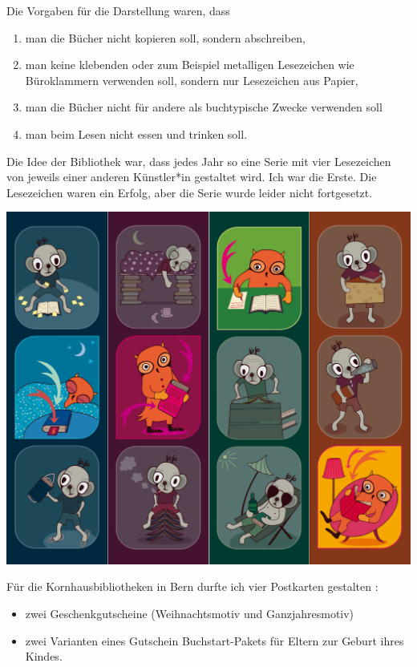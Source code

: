 \documentclass[a4paper,
fontsize=11pt,
oneside,
numbers=noperiodatend,
parskip=half-,
bibliography=totoc,
final
]{scrartcl}
\begin{document}
Die Vorgaben für die Darstellung waren, dass

\begin{enumerate}
\def\labelenumi{\arabic{enumi}.}
\item
  man die Bücher nicht kopieren soll, sondern abschreiben,
\item
  man keine klebenden oder zum Beispiel metalligen Lesezeichen wie
  Büroklammern verwenden soll, sondern nur Lesezeichen aus Papier,
\item
  man die Bücher nicht für andere als buchtypische Zwecke verwenden soll
\item
  man beim Lesen nicht essen und trinken soll.
\end{enumerate}

Die Idee der Bibliothek war, dass jedes Jahr so eine Serie mit vier
Lesezeichen von jeweils einer anderen Künstler*in gestaltet wird. Ich
war die Erste. Die Lesezeichen waren ein Erfolg, aber die Serie wurde
leider nicht fortgesetzt.

\begin{center}
\includegraphics{img/image1.png}
\end{center}

Für die Kornhausbibliotheken in Bern durfte ich vier Postkarten
gestalten :

\begin{itemize}
\item
  zwei Geschenkgutscheine (Weihnachtsmotiv und Ganzjahresmotiv)
\item
  zwei Varianten eines Gutschein Buchstart-Pakets für Eltern zur Geburt
  ihres Kindes.
\end{itemize}
\end{document}
